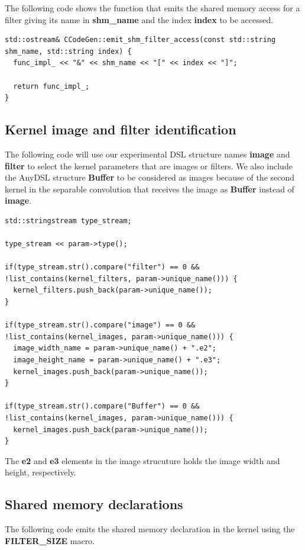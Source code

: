 \documentclass{article}
\begin{document}
The following code shows the function that emits the shared memory access for a filter giving its name in \textbf{shm\_name} and the index \textbf{index} to be accessed.

\begin{verbatim}
std::ostream& CCodeGen::emit_shm_filter_access(const std::string shm_name, std::string index) {
  func_impl_ << "&" << shm_name << "[" << index << "]";

  return func_impl_;
}
\end{verbatim}

\subsection{Kernel image and filter identification}

The following code will use our experimental DSL structure names \textbf{image} and \textbf{filter} to select the kernel parameters that are images or filters. We also include the AnyDSL structure \textbf{Buffer} to be considered as images because of the second kernel in the separable convolution that receives the image as \textbf{Buffer} instead of \textbf{image}.

\begin{verbatim}
std::stringstream type_stream;

type_stream << param->type();

if(type_stream.str().compare("filter") == 0 && !list_contains(kernel_filters, param->unique_name())) {
  kernel_filters.push_back(param->unique_name());
}

if(type_stream.str().compare("image") == 0 && !list_contains(kernel_images, param->unique_name())) {
  image_width_name = param->unique_name() + ".e2";
  image_height_name = param->unique_name() + ".e3";
  kernel_images.push_back(param->unique_name());
}

if(type_stream.str().compare("Buffer") == 0 && !list_contains(kernel_images, param->unique_name())) {
  kernel_images.push_back(param->unique_name());
}
\end{verbatim}

The \textbf{e2} and \textbf{e3} elements in the image strucuture holds the image width and height, respectively.

\subsection{Shared memory declarations}

The following code emits the shared memory declaration in the kernel using the \textbf{FILTER\_SIZE} macro.
\end{document}
